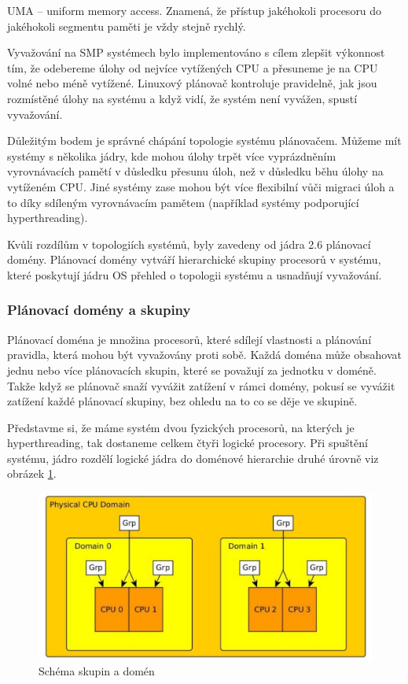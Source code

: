 \documentclass[a4paper,12pt]{article}
\begin{document}
UMA – uniform memory access. Znamená, že přístup jakéhokoli procesoru do jakéhokoli segmentu paměti je vždy stejně rychlý.

Vyvažování na SMP systémech bylo implementováno s cílem zlepšit výkonnost tím, že odebereme úlohy od nejvíce vytížených CPU a přesuneme je na CPU volné nebo méně vytížené. Linuxový plánovač kontroluje pravidelně, jak jsou rozmístěné úlohy na systému a když vidí, že systém není vyvážen, spustí vyvažování.

Důležitým bodem je správné chápání topologie systému plánovačem. Můžeme mít systémy s několika jádry, kde mohou úlohy trpět více vyprázdněním vyrovnávacích pamětí v důsledku přesunu úloh, než v důsledku běhu úlohy na vytíženém CPU. Jiné systémy zase mohou být více flexibilní vůči migraci úloh a to díky sdíleným vyrovnávacím pamětem (například systémy podporující hyperthreading).

Kvůli rozdílům v topologiích systémů, byly zavedeny od jádra 2.6 plánovací domény. Plánovací domény vytváří hierarchické skupiny procesorů v systému, které poskytují jádru OS přehled o topologii systému a usnadňují vyvažování.

\newpage
\subsubsection{Plánovací domény a skupiny}

Plánovací doména je množina procesorů, které sdílejí vlastnosti a plánování pravidla, která mohou být vyvažovány proti sobě. Každá doména může obsahovat jednu nebo více plánovacích skupin, které se považují za jednotku v doméně. Takže když se plánovač snaží vyvážit zatížení v rámci domény, pokusí se vyvážit zatížení každé plánovací skupiny, bez ohledu na to co se děje ve skupině.

Představme si, že máme systém dvou fyzických procesorů, na kterých je hyperthreading, tak dostaneme celkem čtyři logické procesory. Při spuštění systému, jádro rozdělí logické jádra do doménové hierarchie druhé úrovně viz obrázek \ref{domeny a skupiny}.

\begin{figure}[ht]
\includegraphics[scale=0.53]{obrazky/domenyAskupiny.jpeg}
\caption{Schéma skupin a domén}
\label{domeny a skupiny}
\end{figure}
\end{document}
